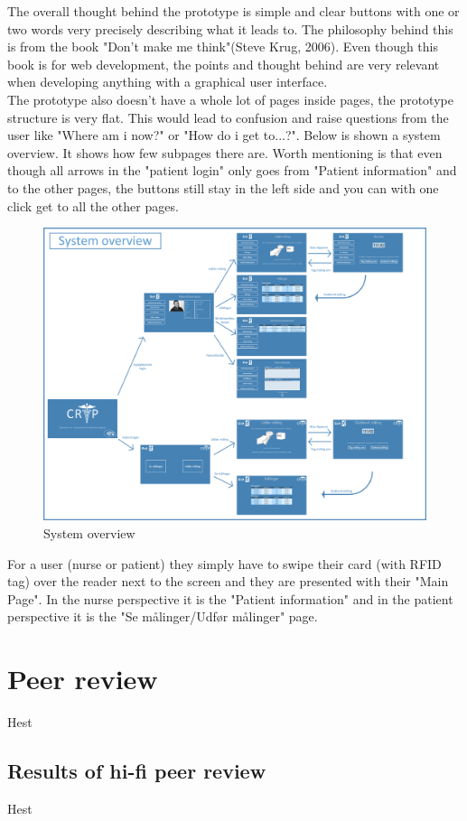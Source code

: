 The overall thought behind the prototype is simple and clear buttons with one or two words very precisely describing what it leads to. The philosophy behind this is from the book "Don't make me think"(Steve Krug, 2006). Even though this book is for web development, the points and thought behind are very relevant when developing anything with a graphical user interface.\\
The prototype also doesn't have a whole lot of pages inside pages, the prototype structure is very flat. This would lead to confusion and raise questions from the user like "Where am i now?" or "How do i get to...?". Below is shown a system overview. It shows how few subpages there are. Worth mentioning is that even though all arrows in the "patient login" only goes from "Patient information" and to the other pages, the buttons still stay in the left side and you can with one click get to all the other pages.\\
\begin{figure}[H]
\centering
\includegraphics[width=1\textwidth]{billeder/system_hifi.png}
\caption{System overview}
\end{figure}
For a user (nurse or patient) they simply have to swipe their card (with RFID tag) over the reader next to the screen and they are presented with their "Main Page". In the nurse perspective it is the "Patient information" and in the patient perspective it is the "Se målinger/Udfør målinger" page.\\


\section{Peer review}
Hest

\subsection{Results of hi-fi peer review}
Hest